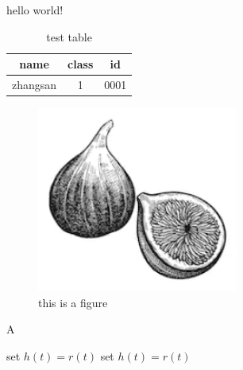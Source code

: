 \documentclass[journal]{IEEEtran}
\begin{document}
hello world!\cite{edge-ai}

\begin{table}
\centering
\caption{test table}

\begin{tabular}{|c|c|c|}
\hline 
name & class & id \\
\hline
zhangsan & 1 & 0001 \\
\hline
\end{tabular}
\end{table}

\begin{figure}
\centering
\includegraphics{fig1.png}
\caption{this is a figure}
\end{figure}
\begin{algorithm}
	\caption{A}
	\label{alg:A}
	\begin{algorithmic}
		\REPEAT 
		\STATE set $h(t)=r(t)$ 
		\REPEAT
		\STATE set $h(t)=r(t)$ 
	\end{algorithmic}
\end{algorithm}




\end{document}
